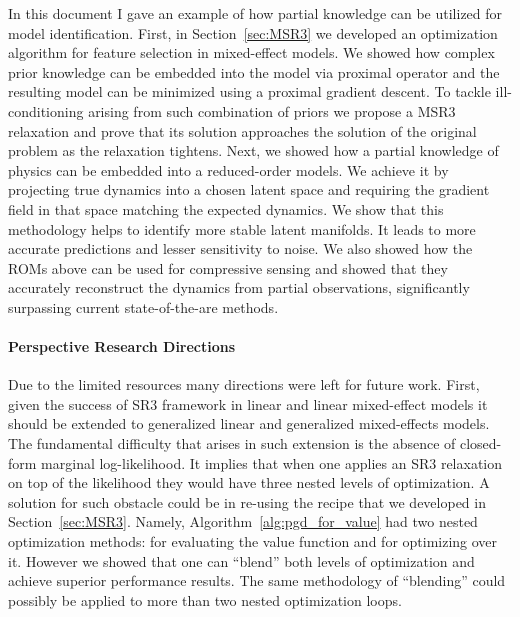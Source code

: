 In this document I gave an example of how partial knowledge can be utilized for model identification. First, in Section~\ref{sec:MSR3} we developed an optimization algorithm for feature selection in mixed-effect models. We showed how complex prior knowledge can be embedded into the model via proximal operator and the resulting model can be minimized using a proximal gradient descent. To tackle ill-conditioning arising from such combination of priors we propose a MSR3 relaxation and prove that its solution approaches the solution of the original problem as the relaxation tightens. Next, we showed how a partial knowledge of physics can be embedded into a reduced-order models. We achieve it by projecting true dynamics into a chosen latent space and requiring the gradient field in that space matching the expected dynamics. We show that this methodology helps to identify more stable latent manifolds. It leads to more accurate predictions and lesser sensitivity to noise. We also showed how the ROMs above can be used for compressive sensing and showed that they accurately reconstruct the dynamics from partial observations, significantly surpassing current state-of-the-are methods. 

\paragraph{Perspective Research Directions} Due to the limited resources many directions were left for future work. First, given the success of SR3 framework in linear and linear mixed-effect models it should be extended to generalized linear and generalized mixed-effects models. The fundamental difficulty that arises in such extension is the absence of closed-form marginal log-likelihood. It implies that when one applies an SR3 relaxation on top of the likelihood they would have three nested levels of optimization. A solution for such obstacle could be in re-using the recipe that we developed in Section~\ref{sec:MSR3}. Namely, Algorithm~\ref{alg:pgd_for_value} had two nested optimization methods: for evaluating the value function and for optimizing over it. However we showed that one can ``blend'' both levels of optimization and achieve superior performance results. The same methodology of ``blending'' could possibly be applied to more than two nested optimization loops.

